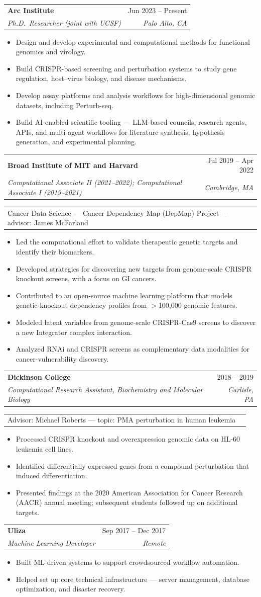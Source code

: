 \documentclass[letterpaper,11pt]{article}
\makeatletter
\newcommand{\resumeItem}[1]{%
  \item\small{#1 \vspace{-2pt}}
}
\newcommand{\cvHeading}[4]{%
  \vspace{-2pt}\item
    \begin{tabular*}{0.97\textwidth}[t]{l@{\extracolsep{\fill}}r}
      \textbf{#1} & #2 \\
      \textit{\small#3} & \textit{\small #4} \\
    \end{tabular*}\vspace{-7pt}
}
\newcommand{\cvSubheading}[2]{%
  \item
    \begin{tabular*}{0.97\textwidth}{l@{\extracolsep{\fill}}r}
      \small#1 & \textit{\small #2} \\
    \end{tabular*}\vspace{-7pt}
}
\newcommand{\bullets}{\begin{itemize}}
\newcommand{\bulletsEnd}{\end{itemize}\vspace{-5pt}}
\makeatother
\begin{document}
  \cvHeading
    {Arc Institute}{Jun 2023 -- Present}
    {Ph.D.\ Researcher (joint with UCSF)}{Palo Alto, CA}
    \bullets
      \resumeItem{Design and develop experimental and computational methods for functional genomics and virology.}
      \resumeItem{Build CRISPR-based screening and perturbation systems to study gene regulation, host--virus biology, and disease mechanisms.}
      \resumeItem{Develop assay platforms and analysis workflows for high-dimensional genomic datasets, including Perturb-seq.}
      \resumeItem{Build AI-enabled scientific tooling --- LLM-based councils, research agents, APIs, and multi-agent workflows for literature synthesis, hypothesis generation, and experimental planning.}
    \bulletsEnd

  \cvHeading
    {Broad Institute of MIT and Harvard}{Jul 2019 -- Apr 2022}
    {Computational Associate II (2021--2022); Computational Associate I (2019--2021)}{Cambridge, MA}
    \cvSubheading{Cancer Data Science --- Cancer Dependency Map (DepMap) Project --- advisor: James McFarland}{}
    \bullets
      \resumeItem{Led the computational effort to validate therapeutic genetic targets and identify their biomarkers.}
      \resumeItem{Developed strategies for discovering new targets from genome-scale CRISPR knockout screens, with a focus on GI cancers.}
      \resumeItem{Contributed to an open-source machine learning platform that models genetic-knockout dependency profiles from $>$100{,}000 genomic features.}
      \resumeItem{Modeled latent variables from genome-scale CRISPR-Cas9 screens to discover a new Integrator complex interaction.}
      \resumeItem{Analyzed RNAi and CRISPR screens as complementary data modalities for cancer-vulnerability discovery.}
    \bulletsEnd

  \cvHeading
    {Dickinson College}{2018 -- 2019}
    {Computational Research Assistant, Biochemistry and Molecular Biology}{Carlisle, PA}
    \cvSubheading{Advisor: Michael Roberts --- topic: PMA perturbation in human leukemia}{}
    \bullets
      \resumeItem{Processed CRISPR knockout and overexpression genomic data on HL-60 leukemia cell lines.}
      \resumeItem{Identified differentially expressed genes from a compound perturbation that induced differentiation.}
      \resumeItem{Presented findings at the 2020 American Association for Cancer Research (AACR) annual meeting; subsequent students followed up on additional targets.}
    \bulletsEnd

  \cvHeading
    {Uliza}{Sep 2017 -- Dec 2017}
    {Machine Learning Developer}{Remote}
    \bullets
      \resumeItem{Built ML-driven systems to support crowdsourced workflow automation.}
      \resumeItem{Helped set up core technical infrastructure --- server management, database optimization, and disaster recovery.}
    \bulletsEnd
\end{document}

